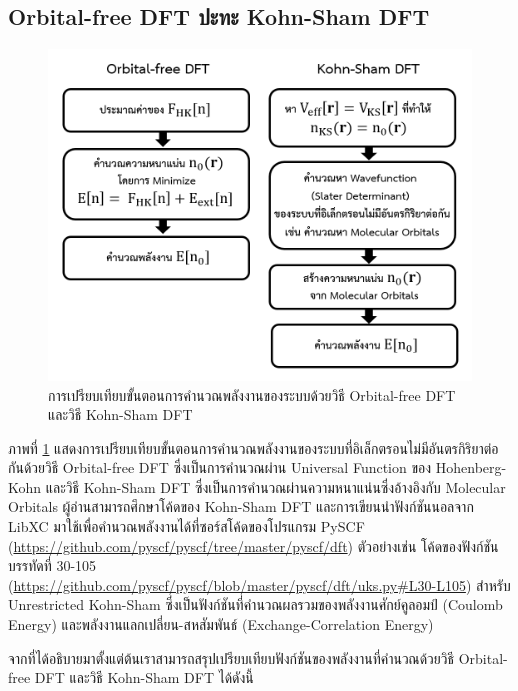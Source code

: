 \subsection{Orbital-free DFT ปะทะ Kohn-Sham DFT}
\label{ssec:orb_free_vs_kohn_sham_dft}

\begin{figure}[H]
    \centering
    \includegraphics[width=0.9\linewidth]{fig/orb_free_vs_kohn_sham.png}
    \caption{การเปรียบเทียบขั้นตอนการคำนวณพลังงานของระบบด้วยวิธี Orbital-free DFT และวิธี Kohn-Sham DFT}
    \label{fig:orb_free_vs_kohn_sham}
\end{figure}

ภาพที่ \ref{fig:orb_free_vs_kohn_sham} แสดงการเปรียบเทียบขั้นตอนการคำนวณพลังงานของระบบที่อิเล็กตรอนไม่มีอันตรกิริยาต่อกันด้วยวิธี Orbital-free DFT ซึ่งเป็นการคำนวณผ่าน Universal Function ของ Hohenberg-Kohn และวิธี Kohn-Sham DFT ซึ่งเป็นการคำนวณผ่านความหนาแน่นซึ่งอ้างอิงกับ Molecular Orbitals ผู้อ่านสามารถศึกษาโค้ดของ Kohn-Sham DFT และการเขียนนำฟังก์ชันนอลจาก LibXC มาใช้เพื่อคำนวณพลังงานได้ที่ซอร์สโค้ดของโปรแกรม PySCF (\url{https://github.com/pyscf/pyscf/tree/master/pyscf/dft}) ตัวอย่างเช่น โค้ดของฟังก์ชัน  บรรทัดที่ 30-105 (\url{https://github.com/pyscf/pyscf/blob/master/pyscf/dft/uks.py#L30-L105}) สำหรับ Unrestricted Kohn-Sham ซึ่งเป็นฟังก์ชันที่คำนวณผลรวมของพลังงานศักย์คูลอมป์ (Coulomb Energy) และพลังงานแลกเปลี่ยน-สหสัมพันธ์ (Exchange-Correlation Energy)

จากที่ได้อธิบายมาตั้งแต่ต้นเราสามารถสรุปเปรียบเทียบฟังก์ชันของพลังงานที่คำนวณด้วยวิธี Orbital-free DFT และวิธี Kohn-Sham DFT ได้ดังนี้

